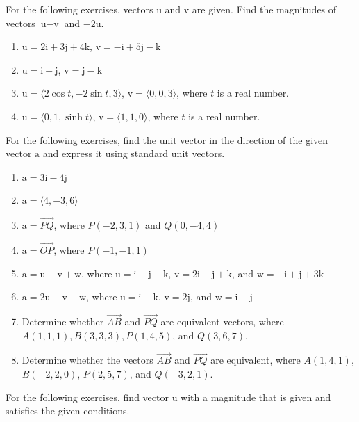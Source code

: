 \documentclass{exercises}
\begin{document}
For the following exercises, vectors u and v are given. Find the magnitudes of vectors $\text{u}-\text{v}$ and $-2\text{u}$.

\begin{enumerate}[resume]
\item $\text{u}=2\text{i}+3\text{j}+4\text{k}$, $\text{v}=-\text{i}+5\text{j}-\text{k}$
\item $\text{u}=\text{i}+\text{j}$, $\text{v}=\text{j}-\text{k}$
\item $\text{u}=\langle2\cos t,-2\sin t,3\rangle$, $\text{v}=\langle0,0,3\rangle$, where $t$ is a real number.
\item $\text{u}=\langle0,1,\sinh t\rangle$, $\text{v}=\langle1,1,0\rangle$, where $t$ is a real number.
\end{enumerate}

For the following exercises, find the unit vector in the direction of the given vector $\text{a}$ and express it using standard unit vectors.

\begin{enumerate}[resume]
\item $\text{a}=3\text{i}-4\text{j}$
\item $\text{a}=\langle4,-3,6\rangle$
\item $\text{a}=\overset{\to}{PQ}$, where $P(-2,3,1)$ and $Q(0,-4,4)$
\item $\text{a}=\overset{\to}{OP}$, where $P(-1,-1,1)$
\item $\text{a}=\text{u}-\text{v}+\text{w}$, where $\text{u}=\text{i}-\text{j}-\text{k}$, $\text{v}=2\text{i}-\text{j}+\text{k}$, and $\text{w}=-\text{i}+\text{j}+3\text{k}$
\item $\text{a}=2\text{u}+\text{v}-\text{w}$, where $\text{u}=\text{i}-\text{k}$, $\text{v}=2\text{j}$, and $\text{w}=\text{i}-\text{j}$
\item Determine whether $\overset{\to}{AB}$ and $\overset{\to}{PQ}$ are equivalent vectors, where $A(1,1,1),B(3,3,3),P(1,4,5)$, and $Q(3,6,7)$.
\item Determine whether the vectors $\overset{\to}{AB}$ and $\overset{\to}{PQ}$ are equivalent, where $A(1,4,1)$, $B(-2,2,0)$, $P(2,5,7)$, and $Q(-3,2,1)$.
\end{enumerate}

For the following exercises, find vector $\text{u}$ with a magnitude that is given and satisfies the given conditions.
\end{document}
